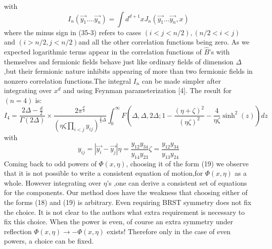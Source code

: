 \documentclass[a4paper,12pt]{article}
\begin{document}
 with
 \begin{equation}
I_{n}(\vec{y_{1}}....\vec{y_{n}})=\int d^{d+1}x
J_{n}(\vec{y_{1}}...\vec{y_{n}},x)
\end{equation}
where the minus sign in (35-3) refers to cases
$(i<j<n/2),(n/2<i<j)$ and $(i>n/2,j<n/2)$and all the other
correlation functions being zero. As we expected logarithmic
terms appear in the correlation functions of $\hat{B}$'s with
themselves and fermionic fields behave just like ordinary fields
of dimension $\Delta$,but their fermionic nature inhibits
appearing of more than two fermionic fields in nonzero correlation
functions.The integral $I_{n}$ can be made simpler after
integrating over $x^{d}$ and using Feynman parameterization [4].
The result for $(n=4)$ is:
\begin{equation}
I_{4}=\frac{2\Delta-\frac{d}{2}}{\Gamma(2\Delta)}\times\frac{2\pi^{\frac{d}{2}}}{(\eta\zeta\prod_{i<j}y_{ij})^{\frac{2}{3}\Delta}}\int_{0}^{\infty}F(\Delta,\Delta,2\Delta;1-\frac{(\eta+\zeta)^{2}}{(\eta\zeta)^{2}}-\frac{4}{\eta\zeta}\sinh^{2}(z))dz
\end{equation}
with
 \begin{equation}
y_{ij}=|\vec{y_{i}}-\vec{y_{j}}|
\eta=\frac{y_{12}y_{34}}{y_{14}y_{23}}
\zeta=\frac{y_{12}y_{34}}{y_{13}y_{24}}
\end{equation}
Coming back to odd powers of $\Phi(x,\eta)$, choosing it of the
form (19) we observe that it is not possible to write a consistent
equation of motion,for $\Phi(x,\eta)$ as a whole. However
integrating over $\eta$'s ,one can derive a consistent set of
equations for the components. Our method does have the weakness
that choosing either of the forms (18) and (19) is arbitrary. Even
requiring BRST symmetry does not fix the choice. It is not clear
to the authors what extra requirement is necessary to fix this
choice. When the power is even, of course an extra symmetry under
reflection   $\Phi(x,\eta)\rightarrow  -\Phi(x,\eta)$ exists!
Therefore only in the case of even powers, a choice can be fixed.
\end{document}
